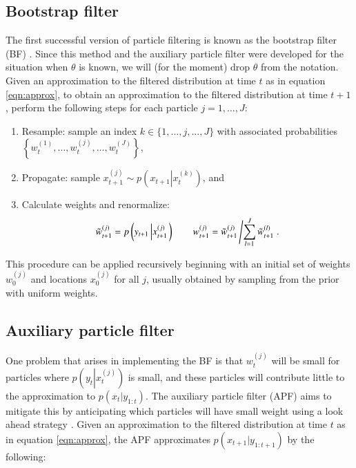 \documentclass{elsarticle}
\begin{document}
\subsection{Bootstrap filter \label{sec:bf}}

The first successful version of particle filtering is known as the bootstrap filter (BF) \citep{Gord:Salm:Smit:nove:1993,Kita:mont:1996}. Since this method and the auxiliary particle filter were developed for the situation when $\theta$ is known, we will (for the moment) drop $\theta$ from the notation. Given an approximation to the filtered distribution at time $t$ as in equation \eqref{eqn:approx}, to obtain an approximation to the filtered distribution at time $t+1$, perform the following steps for each particle $j=1,\ldots,J$:

\begin{enumerate}
\item Resample: sample an index $k\in\{1,\ldots,j,\ldots,J\}$ with associated probabilities $\left\{w_t^{(1)},\ldots,w_t^{(j)},\ldots,w_t^{(J)}\right\}$,
\item Propagate: sample $x_{t+1}^{(j)} \sim p\left( x_{t+1}\left|x_t^{(k)}\right.\right)$, and
\item Calculate weights and renormalize:
\[ \tilde{w}_{t+1}^{(j)} = p\left(y_{t+1}\left|x_{t+1}^{(j)}\right.\right) \qquad w_{t+1}^{(j)} = \tilde{w}_{t+1}^{(j)}\left/ \sum_{l=1}^J \tilde{w}_{t+1}^{(l)} \right. .\]
\end{enumerate}

\noindent This procedure can be applied recursively beginning with an initial set of weights $w_0^{(j)}$ and locations $x_0^{(j)}$ for all $j$, usually obtained by sampling from the prior with uniform weights.

\subsection{Auxiliary particle filter \label{sec:apf}}

One problem that arises in implementing the BF is that $w_t^{(j)}$ will be small for particles where $p\left(y_{t}\left|x_{t}^{(j)}\right.\right)$ is small, and these particles will contribute little to the approximation to $p(x_{t}|y_{1:t})$. The auxiliary particle filter (APF) aims to mitigate this by anticipating which particles will have small weight using a look ahead strategy \citep{Pitt:Shep:filt:1999}. Given an approximation to the filtered distribution at time $t$ as in equation \eqref{eqn:approx}, the APF approximates $p(x_{t+1}|y_{1:t+1})$ by the following:
\end{document}
